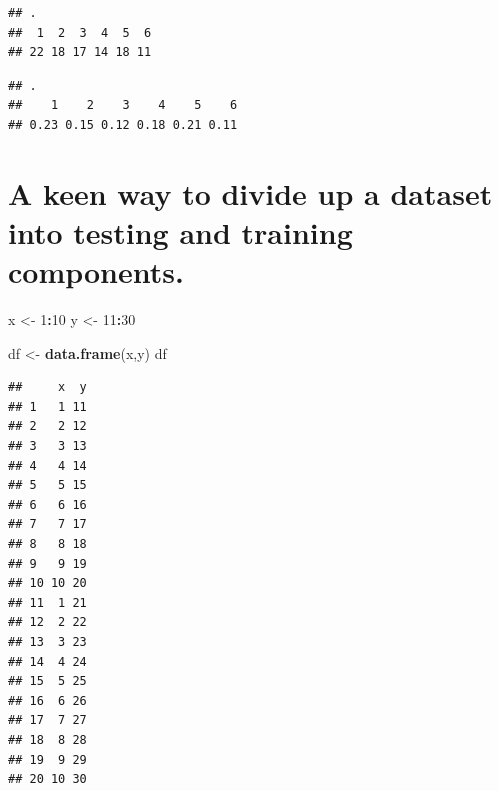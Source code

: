 \documentclass[]{book}
\newenvironment{Shaded}{\begin{snugshade}}{\end{snugshade}}
\newcommand{\DataTypeTok}[1]{\textcolor[rgb]{0.13,0.29,0.53}{#1}}
\newcommand{\DecValTok}[1]{\textcolor[rgb]{0.00,0.00,0.81}{#1}}
\newcommand{\KeywordTok}[1]{\textcolor[rgb]{0.13,0.29,0.53}{\textbf{#1}}}
\newcommand{\NormalTok}[1]{#1}
\newcommand{\OperatorTok}[1]{\textcolor[rgb]{0.81,0.36,0.00}{\textbf{#1}}}
\newcommand{\OtherTok}[1]{\textcolor[rgb]{0.56,0.35,0.01}{#1}}
\newcommand{\StringTok}[1]{\textcolor[rgb]{0.31,0.60,0.02}{#1}}
\begin{document}
\begin{Shaded}
\end{Shaded}

\begin{verbatim}
## .
##  1  2  3  4  5  6 
## 22 18 17 14 18 11
\end{verbatim}

\begin{Shaded}
\end{Shaded}

\begin{verbatim}
## .
##    1    2    3    4    5    6 
## 0.23 0.15 0.12 0.18 0.21 0.11
\end{verbatim}

\hypertarget{a-keen-way-to-divide-up-a-dataset-into-testing-and-training-components.}{%
\section{A keen way to divide up a dataset into testing and training components.}\label{a-keen-way-to-divide-up-a-dataset-into-testing-and-training-components.}}

\begin{Shaded}
\begin{Highlighting}[]
\NormalTok{x <-}\StringTok{ }\DecValTok{1}\OperatorTok{:}\DecValTok{10}
\NormalTok{y <-}\StringTok{ }\DecValTok{11}\OperatorTok{:}\DecValTok{30}

\NormalTok{df <-}\StringTok{ }\KeywordTok{data.frame}\NormalTok{(x,y)}
\NormalTok{df}
\end{Highlighting}
\end{Shaded}

\begin{verbatim}
##     x  y
## 1   1 11
## 2   2 12
## 3   3 13
## 4   4 14
## 5   5 15
## 6   6 16
## 7   7 17
## 8   8 18
## 9   9 19
## 10 10 20
## 11  1 21
## 12  2 22
## 13  3 23
## 14  4 24
## 15  5 25
## 16  6 26
## 17  7 27
## 18  8 28
## 19  9 29
## 20 10 30
\end{verbatim}
\end{document}
